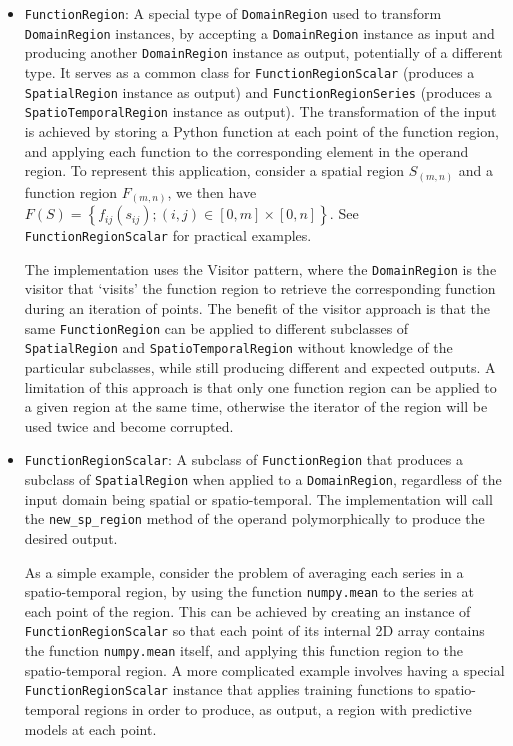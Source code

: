 \begin{itemize}
	\item \texttt{FunctionRegion}: A special type of \texttt{DomainRegion} used to transform \texttt{DomainRegion} instances, by accepting a \texttt{DomainRegion} instance as input and producing another \texttt{DomainRegion} instance as output, potentially of a different type. It serves as a common class for \texttt{FunctionRegionScalar} (produces a \texttt{SpatialRegion} instance as output) and \texttt{FunctionRegionSeries} (produces a \texttt{SpatioTemporalRegion} instance as output). The transformation of the input is achieved by storing a Python function at each point of the function region, and applying each function to the corresponding element in the operand region. To represent this application, consider a spatial region $S_{(m,n)}$ and a function region $F_{(m,n)}$, we then have $F(S) = \left\{ f_{ij}(s_{ij}); (i, j) \in [0, m]\times[0, n] \right\}$. See \texttt{FunctionRegionScalar} for practical examples.
	
	The implementation uses the Visitor pattern, where the \texttt{DomainRegion} is the visitor that `visits' the function region to retrieve the corresponding function during an iteration of points. The benefit of the visitor approach is that the same \texttt{FunctionRegion} can be applied to different subclasses of \texttt{SpatialRegion} and \texttt{SpatioTemporalRegion} without knowledge of the particular subclasses, while still producing different and expected outputs. A limitation of this approach is that only one function region can be applied to a given region at the same time, otherwise the iterator of the region will be used twice and become corrupted.
	
	\item \texttt{FunctionRegionScalar}: A subclass of \texttt{FunctionRegion} that produces a subclass of \texttt{SpatialRegion} when applied to a \texttt{DomainRegion}, regardless of the input domain being spatial or spatio-temporal. The implementation will call the \texttt{new\_sp\_region} method of the operand polymorphically to produce the desired output.
	
	As a simple example, consider the problem of averaging each series in a spatio-temporal region, by using the function \texttt{numpy.mean} to the series at each point of the region. This can be achieved by creating an instance of \texttt{FunctionRegionScalar} so that each point of its internal 2D array contains the function \texttt{numpy.mean} itself, and applying this function region to the spatio-temporal region. A more complicated example involves having a special \texttt{FunctionRegionScalar} instance that applies training functions to spatio-temporal regions in order to produce, as output, a region with predictive models at each point.
	

\end{itemize}
